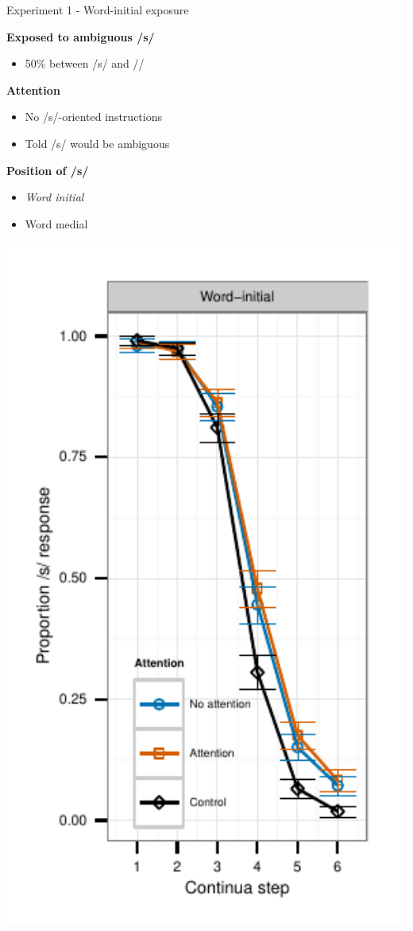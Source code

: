 \documentclass{beamer}
\begin{document}
\begin{frame}{Experiment 1 - Word-initial exposure}

\begin{minipage}{0.45\textwidth}
\textbf{Exposed to ambiguous /s/}
\begin{itemize}
\item 50\% between /s/ and /\textesh/
\end{itemize}

\textbf{Attention}
\begin{itemize}
\item No /s/-oriented instructions
\item Told /s/ would be ambiguous
\end{itemize}

\textbf{Position of /s/}
\begin{itemize}
\item \emph{Word initial}
\item Word medial
\end{itemize}
\end{minipage}
\hfill
\begin{minipage}{0.4\textwidth}
\includegraphics[width=1.0\textwidth]{graphs/exp1_categresults_present2-initial}
\end{minipage}


\end{frame}
\end{document}
